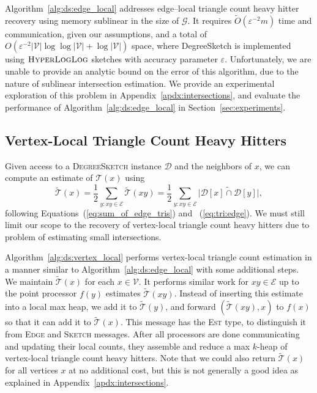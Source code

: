 \documentclass{vldb}
\newcommand{\algoname}[1]{\textnormal{\textsc{#1}}}
\begin{document}
Algorithm~\ref{alg:ds:edge_local} addresses edge--local triangle count heavy hitter recovery using memory sublinear in the size of $\mathcal{G}$. 
It requires $\widetilde{O}(\varepsilon^{-2}m)$ time and communication, given our assumptions, and a total of $O(\varepsilon^{-2} |\mathcal{V}| \log\log |\mathcal{V}| + \log |\mathcal{V}|)$ space, where DegreeSketch is implemented using $\algoname{HyperLogLog}$ sketches with accuracy parameter  $\varepsilon$. 
Unfortunately, we are unable to provide an analytic bound on the error of this algorithm, due to the nature of sublinear intersection estimation. 
We provide an experimental exploration of this problem in Appendix~\ref{apdx:intersections}, and evaluate the performance of Algorithm~\ref{alg:ds:edge_local} in Section~\ref{sec:experiments}.



\subsection{Vertex-Local Triangle Count Heavy Hitters}
 \label{sec:vertex_triangles}

Given access to a \algoname{DegreeSketch} instance $\mathcal{D}$ and the neighbors of $x$, we can compute an estimate of $\mathcal{T}(x)$ using
%
\begin{equation} \label{eq:tri:vertex}
	\widetilde{\mathcal{T}}(x) 
	= \frac{1}{2} \sum_{y: xy \in \mathcal{E}} \widetilde{\mathcal{T}}(xy)  
	= \frac{1}{2} \sum_{y: xy \in \mathcal{E}} \widetilde{|\mathcal{D}[x] \cap \mathcal{D}[y]|},
\end{equation}
following Equations~(\ref{eq:sum_of_edge_tris}) and ~(\ref{eq:tri:edge}).
%
We must still limit our scope to the recovery of vertex-local triangle count heavy hitters due to problem of estimating small intersections.

Algorithm~\ref{alg:ds:vertex_local} performs vertex-local triangle count estimation in a manner similar to Algorithm~\ref{alg:ds:edge_local} with some additional steps. 
We maintain $\widetilde{\mathcal{T}}(x)$ for each $x \in \mathcal{V}$.
It performs similar work for $xy \in \mathcal{E}$ up to the point processor $f(y)$ estimates $\widetilde{\mathcal{T}}(xy)$. 
Instead of inserting this estimate into a local max heap, we add it to $\widetilde{\mathcal{T}}(y)$, and forward $(\widetilde{\mathcal{T}}(xy), x)$ to $f(x)$ so that it can add it to $\widetilde{\mathcal{T}}(x)$.
This message has the \algoname{Est} type, to distinguish it from \algoname{Edge} and \algoname{Sketch} messages.
After all processors are done communicating and updating their local counts, they assemble and reduce a max $k$-heap of vertex-local triangle count heavy hitters.
Note that we could also return $\widetilde{\mathcal{T}}(x)$ for all vertices $x$ at no additional cost, but this is not generally a good idea as explained in Appendix~\ref{apdx:intersections}.
\end{document}
